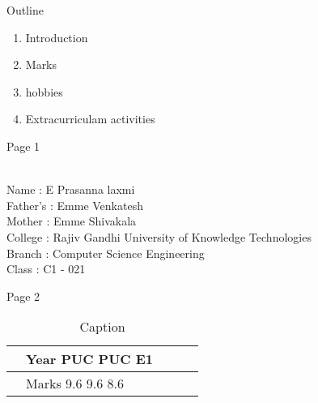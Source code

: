 \documentclass{beamer}
\author{E Prasanna laxmi}
\date{\today}
\begin{document}
\begin{frame}
    \titlepage
\end{frame}

 \begin{frame}{Outline}
     \tableofcontents
     \begin{enumerate}
         \item Introduction
         \item Marks
         \item hobbies
         \item Extracurriculam activities
     \end{enumerate}
     
     
 \end{frame}
 \begin{frame}{Page 1}
 
 
 {\color{red}{INTRODUCTION}}\\
  Name : E Prasanna laxmi\\
  Father's : Emme Venkatesh\\
  Mother : Emme Shivakala\\
  College : Rajiv Gandhi University of Knowledge Technologies\\
  Branch : Computer Science Engineering\\
  Class : C1 - 021
  
 
 \end{frame}
 
 \begin{frame}{Page 2}
 
 
 
 {\color{purple}{MARKS}}
 \begin{table}[h]
     \centering
     \begin{tabular}{| l | l | l | l | l|}
          &Year  PUC PUC E1 \\
          \hline
          &Marks 9.6 9.6 8.6
     \end{tabular}
     \caption{Caption}
     \label{tab:my_label}
 \end{table}
 
     
 \end{frame}

%
\end{document}

